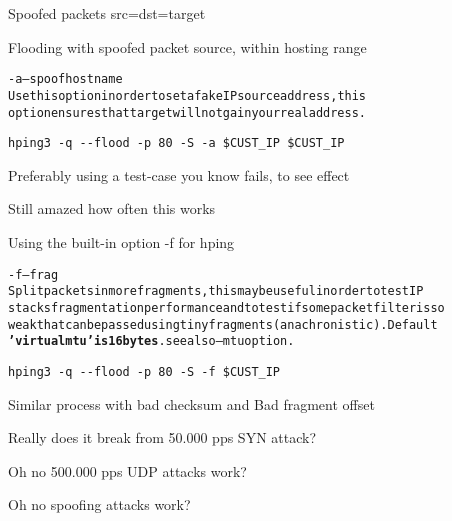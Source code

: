 \documentclass[Screen16to9,17pt]{foils}
\begin{document}
Spoofed packets src=dst=target \smiley

Flooding with spoofed packet source, within hosting range

\begin{alltt}\small

-a --spoof hostname
    Use this option in order to set a fake IP  source  address,  this
    option ensures that target will not gain your real address.
\end{alltt}

\verb+hping3 -q --flood -p 80 -S -a $CUST_IP $CUST_IP+

Preferably using a test-case you know fails, to see effect

Still amazed how often this works




Using the built-in option -f for hping

\begin{alltt}\small
-f --frag
    Split  packets  in more fragments, this may be useful in order to test IP
    stacks fragmentation performance and to test if some packet filter is  so
    weak  that  can  be  passed using tiny fragments (anachronistic). Default
    {\bf 'virtual mtu' is 16 bytes}. see also --mtu option.
\end{alltt}

\begin{list1}
\item \verb+hping3 -q --flood -p 80 -S -f $CUST_IP+
\item Similar process with bad checksum and Bad fragment offset
\end{list1}



\centerline{Really does it break from 50.000 pps SYN attack?}



\centerline{Oh no 500.000 pps UDP attacks work?}


\centerline{Oh no spoofing attacks work?}


\end{document}
